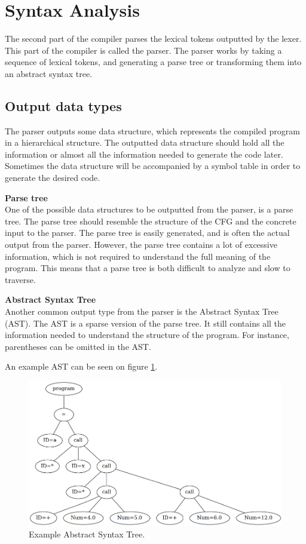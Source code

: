 \section{Syntax Analysis}
The second part of the compiler parses the lexical tokens outputted by the lexer. 
This part of the compiler is called the parser. 
The parser works by taking a sequence of lexical tokens, and generating a parse tree or transforming them into an abstract syntax tree. 

\subsection{Output data types}
The parser outputs some data structure, which represents the compiled program in a hierarchical structure. 
The outputted data structure should hold all the information or almost all the information needed to generate the code later. 
Sometimes the data structure will be accompanied by a symbol table in order to generate the desired code.

\textbf{Parse tree}\\
One of the possible data structures to be outputted from the parser, is a parse tree. 
The parse tree should resemble the structure of the CFG and the concrete input to the parser. 
The parse tree is easily generated, and is often the actual output from the parser. 
However, the parse tree contains a lot of excessive information, which is not required to understand the full meaning of the program. 
This means that a parse tree is both difficult to analyze and slow to traverse. 

\textbf{Abstract Syntax Tree}\\
Another common output type from the parser is the Abstract Syntax Tree (AST).
The AST is a sparse version of the parse tree. 
It still contains all the information needed to understand the structure of the program. 
For instance, parentheses can be omitted in the AST.

An example AST can be seen on figure \ref{fig:ast}.

\begin{figure}[H]
	\centering
	\includegraphics[width=\textwidth*5/6]{3.Theory/images/ast.png}
	\caption{
		Example Abstract Syntax Tree.
	}
	\label{fig:ast}
\end{figure}

